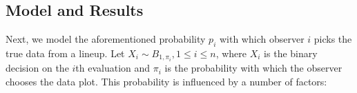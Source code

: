\documentclass{article}\usepackage[]{graphicx}\usepackage[]{color}
\begin{document}
\newpage
\begin{appendix}
\section{Model and Results}


% 

Next, we model the aforementioned probability $p_i$ with which observer $i$ picks the true data from a lineup. 
Let $X_i \sim B_{1, \pi_i}, 1 \le i \le n$, where $X_i$ is the binary decision on the $i$th evaluation and $\pi_i$ is the probability with which the observer chooses the data plot. This probability is influenced by a number of factors:


\end{appendix}
\end{document}
